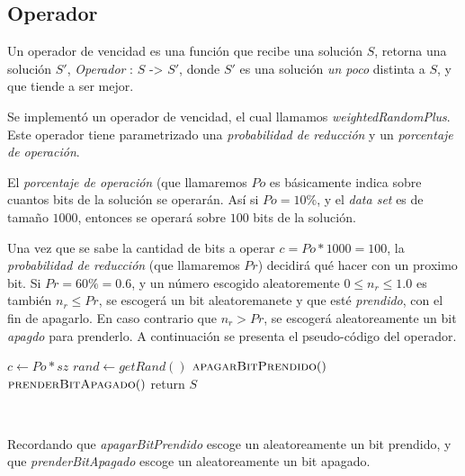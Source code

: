 \documentclass[11pt]{article}
\begin{document}
\subsection{Operador}

Un operador de vencidad es una función que recibe una solución $S$,
retorna una solución $S'$,  \emph{Operador} : $S$ -> $S'$, donde $S'$ es una solución \emph{un poco} distinta
a $S$, y que tiende a ser mejor.

Se implementó un operador de vencidad, el cual llamamos \emph{weightedRandomPlus}.
Este operador tiene parametrizado una \emph{probabilidad de reducción} y
un \emph{porcentaje de operación}. 

El \emph{porcentaje de operación} (que llamaremos $Po$ es básicamente
indica sobre cuantos bits de la solución se operarán. Así si $Po = 10 \%$,
y el \emph{data set} es de tamaño $1000$, entonces se operará sobre
$100$ bits de la solución.

Una vez que se sabe la cantidad de bits a operar $c = Po * 1000 = 100$,
la \emph{probabilidad de reducción} (que llamaremos $Pr$)
decidirá qué hacer con un proximo bit.
Si $Pr = 60 \% = 0.6$, y un número escogido aleatoremente $0 \le n_{r} \le 1.0$
es también $n_{r} \le Pr$, se escogerá un bit aleatoremanete y que esté
\emph{prendido}, con el fin de apagarlo. En caso contrario que $n_{r} > Pr$,
se escogerá aleatoreamente un bit \emph{apagdo} para prenderlo. A continuación
se presenta el pseudo-código del operador. \\


    {\fontsize{10}{10}\selectfont
    \begin{algorithmic}
        \State $c \gets Po * sz$   
                \State $rand \gets getRand()$     
                \State $\Call{apagarBitPrendido}$ 
                \Else
                \State $\Call{prenderBitApagado}$ 
                \EndIf
            \EndFor
            \State return $S$
        \EndFunction
    \end{algorithmic}
    }

    ~\ 

  Recordando que \emph{apagarBitPrendido} escoge un aleatoreamente un bit prendido,
  y  que \emph{prenderBitApagado} escoge un aleatoreamente un bit apagado.
\end{document}
